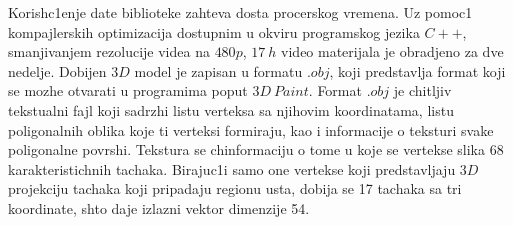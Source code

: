 \documentclass[a4paper, openany, oneside, 11pt]{book}
\begin{document}
Korish\-c1enje date biblioteke zahteva dosta procerskog vremena. Uz pomoc1 kompajlerskih optimizacija dostupnim u okviru programskog jezika $C++$, smanjivanjem rezolucije videa na $480p$, $\SI{17}{h}$ video materijala je obradjeno za dve nedelje. Dobijen $3D$ model je zapisan u formatu $.obj$, koji predstavlja format koji se mozhe otvarati u programima poput $3D\ Paint$. Format $.obj$ je chitljiv tekstualni fajl \cite{obj} koji sadrzhi listu verteksa sa njihovim koordinatama, listu poligonalnih oblika koje ti verteksi formiraju, kao i informacije o teksturi svake poligonalne povrshi. Tekstura se chinformaciju o tome u koje se vertekse slika 68 karakteristichnih tachaka. Birajuc1i samo one vertekse koji predstavljaju $3D$ projekciju tachaka koji pripadaju regionu usta, dobija se 17 tachaka sa tri koordinate, shto daje izlazni vektor dimenzije 54.
\begin{table}[!h]
	\begin{center}
	\end{center}
\caption{Mapiranje karakteristichnih tachaka usta na $3D$ model}
\label{tab:3_1}
\end{table}
\end{document}
